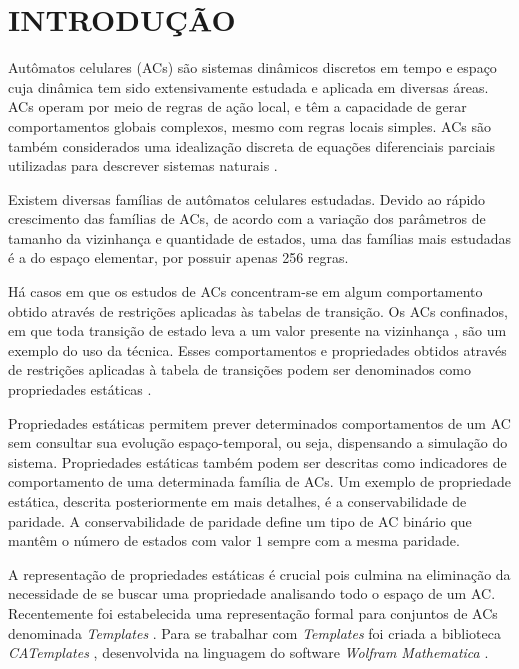 \section{INTRODUÇÃO}
\label{sec:introducao}

Autômatos celulares (ACs) são sistemas dinâmicos discretos em tempo e espaço cuja dinâmica tem sido extensivamente estudada e aplicada em diversas áreas. %
ACs operam por meio de regras de ação local, e têm a capacidade de gerar comportamentos globais complexos, mesmo com regras locais simples. %
ACs são também considerados uma idealização discreta de equações diferenciais parciais utilizadas para descrever sistemas naturais \cite{wolfram1994cellular}.

Existem diversas famílias de autômatos celulares estudadas. Devido ao rápido crescimento das famílias de ACs, de acordo com a variação dos parâmetros de tamanho da vizinhança e quantidade de estados, uma das famílias mais estudadas é a do espaço elementar, por possuir apenas 256 regras.

Há casos em que os estudos de ACs concentram-se em algum comportamento obtido através de restrições aplicadas às tabelas de transição. Os ACs confinados, em que toda transição de estado leva a um valor presente na vizinhança \cite{theyssier2004captive}, são um exemplo do uso da técnica. Esses comportamentos e propriedades obtidos através de restrições aplicadas à tabela de transições podem ser denominados como propriedades estáticas \cite{Verardo2014}.

Propriedades estáticas permitem prever determinados comportamentos de um AC sem consultar sua evolução espaço-temporal, ou seja, dispensando a simulação do sistema. Propriedades estáticas também podem ser descritas como indicadores de comportamento de uma determinada família de ACs. Um exemplo de propriedade estática, descrita posteriormente em mais detalhes, é a conservabilidade de paridade. A conservabilidade de paridade define um tipo de AC binário que mantêm o número de estados com valor $1$ sempre com a mesma paridade.%

A representação de propriedades estáticas é crucial pois culmina na eliminação da necessidade de se buscar uma propriedade analisando todo o espaço de um AC. Recentemente foi estabelecida uma representação formal para conjuntos de ACs denominada \textit{Templates} \cite{deOliveira2014,deOliveira2014b}. Para se trabalhar com  \textit{Templates} foi criada a biblioteca \textit{CATemplates} \cite{CATemplates}, desenvolvida na linguagem do software \textit{Wolfram Mathematica} \cite{woframMathematica10}.

